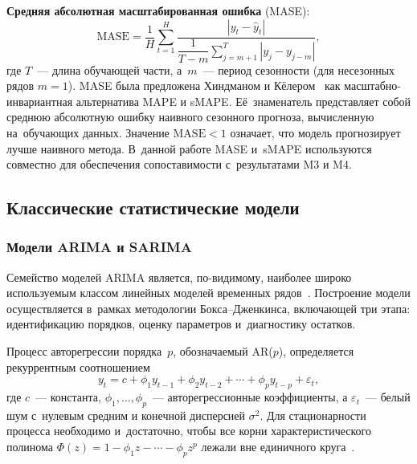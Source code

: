 \textbf{Средняя абсолютная масштабированная ошибка} (MASE):
\begin{equation}
\label{eq:mase}
\mathrm{MASE} = \frac{1}{H}\sum_{t=1}^{H}
   \frac{|y_t - \hat{y}_t|}{\dfrac{1}{T-m}\displaystyle\sum_{j=m+1}^{T}|y_j - y_{j-m}|},
\end{equation}
где $T$~--- длина обучающей части, а~$m$~--- период сезонности
(для несезонных рядов $m = 1$).  MASE была предложена Хиндманом и
Кёлером~\cite{hyndman2006accuracy} как масштабно-инвариантная альтернатива
MAPE и sMAPE.  Её~знаменатель представляет собой среднюю абсолютную ошибку
наивного сезонного прогноза, вычисленную на~обучающих данных.  Значение
$\mathrm{MASE} < 1$ означает, что модель прогнозирует лучше наивного
метода.  В~данной работе MASE и~sMAPE используются совместно для
обеспечения сопоставимости с~результатами M3 и M4.



\subsection{Классические статистические модели}
\label{subsec:classical-models}

\subsubsection{Модели ARIMA и SARIMA}
\label{sssec:arima}

Семейство моделей ARIMA
является, по-видимому, наиболее широко используемым классом линейных
моделей временных рядов~\cite{box1970time}.  Построение модели
осуществляется в~рамках методологии Бокса--Дженкинса, включающей три
этапа: идентификацию порядков, оценку параметров и~диагностику остатков.

Процесс авторегрессии порядка~$p$, обозначаемый AR($p$), определяется
рекуррентным соотношением
\begin{equation}
\label{eq:ar}
y_t = c + \phi_1 y_{t-1} + \phi_2 y_{t-2} + \cdots + \phi_p y_{t-p} + \varepsilon_t,
\end{equation}
где $c$~--- константа, $\phi_1, \ldots, \phi_p$~--- авторегрессионные
коэффициенты, а $\varepsilon_t$~--- белый шум с~нулевым средним и
конечной дисперсией $\sigma^2$.  Для стационарности процесса необходимо
и~достаточно, чтобы все корни характеристического полинома
$\Phi(z) = 1 - \phi_1 z - \cdots - \phi_p z^p$ лежали вне единичного
круга~\cite{hamilton1994time}.


